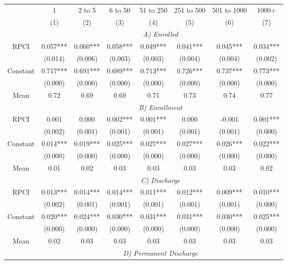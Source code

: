 \begin{tabular}{cccccccc}
\toprule
\toprule
      & 1     & 2 to 5 & 6 to 50 & 51 to 250 & 251 to 500 & 501 to 1000 & 1000+ \\
      & (1)   & (2)   & (3)   & (4)   & (5)   & (6)   & (7) \\
\cmidrule{2-8}      & \multicolumn{7}{c}{\textit{A) Enrolled}} \\
\midrule
RPCI  & 0.057*** & 0.060*** & 0.058*** & 0.049*** & 0.041*** & 0.045*** & 0.034*** \\
      & (0.014) & (0.006) & (0.003) & (0.003) & (0.004) & (0.004) & (0.002) \\
Constant & 0.717*** & 0.691*** & 0.689*** & 0.713*** & 0.726*** & 0.737*** & 0.773*** \\
      & (0.000) & (0.000) & (0.000) & (0.000) & (0.000) & (0.000) & (0.000) \\
Mean  & 0.72  & 0.69  & 0.69  & 0.71  & 0.73  & 0.74  & 0.77 \\
\cmidrule{2-8}      & \multicolumn{7}{c}{\textit{B) Enrollment}} \\
\midrule
RPCI  & 0.001 & 0.000 & 0.002*** & 0.001*** & 0.000 & -0.001 & 0.001*** \\
      & (0.002) & (0.001) & (0.001) & (0.001) & (0.001) & (0.001) & (0.000) \\
Constant & 0.014*** & 0.019*** & 0.025*** & 0.027*** & 0.027*** & 0.026*** & 0.022*** \\
      & (0.000) & (0.000) & (0.000) & (0.000) & (0.000) & (0.000) & (0.000) \\
Mean  & 0.01  & 0.02  & 0.03  & 0.03  & 0.03  & 0.03  & 0.02 \\
\cmidrule{2-8}      & \multicolumn{7}{c}{\textit{C) Discharge}} \\
\midrule
RPCI  & 0.013*** & 0.014*** & 0.014*** & 0.011*** & 0.012*** & 0.009*** & 0.010*** \\
      & (0.002) & (0.001) & (0.001) & (0.001) & (0.001) & (0.001) & (0.000) \\
Constant & 0.020*** & 0.024*** & 0.030*** & 0.031*** & 0.031*** & 0.030*** & 0.025*** \\
      & (0.000) & (0.000) & (0.000) & (0.000) & (0.000) & (0.000) & (0.000) \\
Mean  & 0.02  & 0.03  & 0.03  & 0.03  & 0.03  & 0.03  & 0.03 \\
\cmidrule{2-8}      & \multicolumn{7}{c}{\textit{D) Permanent Discharge}} \\

\end{tabular}
